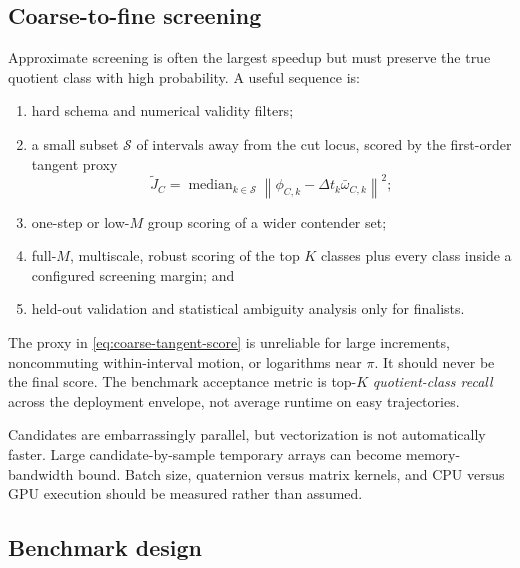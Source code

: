 \documentclass[11pt]{article}
\newcommand{\median}{\operatorname{median}}
\newcommand{\norm}[1]{\left\lVert #1 \right\rVert}
\begin{document}
    \subsection{Coarse-to-fine screening}

    Approximate screening is often the largest speedup but must preserve the true quotient
    class with high probability. A useful sequence is:
    \begin{enumerate}[nosep]
    \item hard schema and numerical validity filters;
    \item a small subset $\mathcal S$ of intervals away from the cut locus, scored by the
    first-order tangent proxy
    \begin{equation}
        \widetilde J_C
        =\median_{k\in\mathcal S}
        \norm{\phi_{C,k}-\Delta t_k\bar\omega_{C,k}}^2;
        \label{eq:coarse-tangent-score}
    \end{equation}
    \item one-step or low-$M$ group scoring of a wider contender set;
    \item full-$M$, multiscale, robust scoring of the top $K$ classes plus every class
    inside a configured screening margin; and
    \item held-out validation and statistical ambiguity analysis only for finalists.
    \end{enumerate}
    The proxy in \eqref{eq:coarse-tangent-score} is unreliable for large increments,
    noncommuting within-interval motion, or logarithms near $\pi$. It should never be the
    final score. The benchmark acceptance metric is top-$K$ \emph{quotient-class recall}
    across the deployment envelope, not average runtime on easy trajectories.

    Candidates are embarrassingly parallel, but vectorization is not automatically faster.
    Large candidate-by-sample temporary arrays can become memory-bandwidth bound. Batch size,
    quaternion versus matrix kernels, and CPU versus GPU execution should be measured rather
    than assumed.

    \subsection{Benchmark design}
\end{document}

